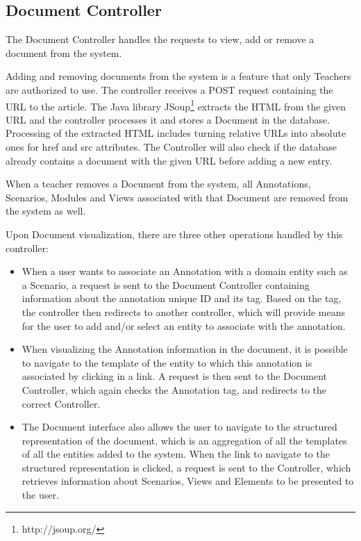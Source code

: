 \subsection{Document Controller}
The Document Controller handles the requests to view, add or remove a document from the system.

Adding and removing documents from the system is a feature that only Teachers are authorized to use. The controller receives a POST request containing the URL to the article. The Java library JSoup\footnote{http://jsoup.org/} extracts the HTML from the given URL and the controller processes it and stores a Document in the database. Processing of the extracted HTML includes turning relative URLs into absolute ones for href and src attributes.
The Controller will also check if the database already contains a document with the given URL before adding a new entry. 

When a teacher removes a Document from the system, all Annotations, Scenarios, Modules and Views associated with that Document are removed from the system as well.

Upon Document visualization, there are three other operations handled by this controller:
\begin{itemize}
\item When a user wants to associate an Annotation with a domain entity such as a Scenario, a request is sent to the Document Controller containing information about the annotation unique ID and its tag. Based on the tag, the controller then redirects to another controller, which will provide means for the user to add and/or select an entity to associate with the annotation.

\item When visualizing the Annotation information in the document, it is possible to navigate to the template of the entity to which this annotation is associated by clicking in a link. A request is then sent to the Document Controller, which again checks the Annotation tag, and redirects to the correct Controller.

\item The Document interface also allows the user to navigate to the structured representation of the document, which is an aggregation of all the templates of all the entities added to the system. When the link to navigate to the structured representation is clicked, a request is sent to the Controller, which retrieves information about Scenarios, Views and Elements to be presented to the user.  
\end{itemize}

